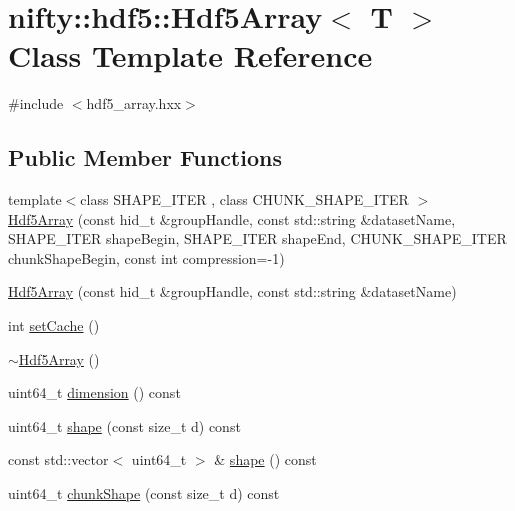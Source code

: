 \hypertarget{classnifty_1_1hdf5_1_1Hdf5Array}{}\section{nifty\+:\+:hdf5\+:\+:Hdf5\+Array$<$ T $>$ Class Template Reference}
\label{classnifty_1_1hdf5_1_1Hdf5Array}


{\ttfamily \#include $<$hdf5\+\_\+array.\+hxx$>$}

\subsection*{Public Member Functions}
\begin{DoxyCompactItemize}
\item 
{\footnotesize template$<$class S\+H\+A\+P\+E\+\_\+\+I\+T\+E\+R , class C\+H\+U\+N\+K\+\_\+\+S\+H\+A\+P\+E\+\_\+\+I\+T\+E\+R $>$ }\\\hyperlink{classnifty_1_1hdf5_1_1Hdf5Array_af164b10a52ab55e3f5a72004b6f6e278}{Hdf5\+Array} (const hid\+\_\+t \&group\+Handle, const std\+::string \&dataset\+Name, S\+H\+A\+P\+E\+\_\+\+I\+T\+E\+R shape\+Begin, S\+H\+A\+P\+E\+\_\+\+I\+T\+E\+R shape\+End, C\+H\+U\+N\+K\+\_\+\+S\+H\+A\+P\+E\+\_\+\+I\+T\+E\+R chunk\+Shape\+Begin, const int compression=-\/1)
\item 
\hyperlink{classnifty_1_1hdf5_1_1Hdf5Array_a8ce039a0d357f3c20a30fa5f6d595cb5}{Hdf5\+Array} (const hid\+\_\+t \&group\+Handle, const std\+::string \&dataset\+Name)
\item 
int \hyperlink{classnifty_1_1hdf5_1_1Hdf5Array_a59e94ddc29dd4ba7e85a11c68960ea77}{set\+Cache} ()
\item 
\hyperlink{classnifty_1_1hdf5_1_1Hdf5Array_a6f02962174e64b4c893b287f735cd30d}{$\sim$\+Hdf5\+Array} ()
\item 
uint64\+\_\+t \hyperlink{classnifty_1_1hdf5_1_1Hdf5Array_a31ff7ce3b1524babd925a2013c590665}{dimension} () const 
\item 
uint64\+\_\+t \hyperlink{classnifty_1_1hdf5_1_1Hdf5Array_aeb4aac8f0da32df48d776c608798991e}{shape} (const size\+\_\+t d) const 
\item 
const std\+::vector$<$ uint64\+\_\+t $>$ \& \hyperlink{classnifty_1_1hdf5_1_1Hdf5Array_af749bd9be409404fb41fa614dcdd3c45}{shape} () const 
\item 
uint64\+\_\+t \hyperlink{classnifty_1_1hdf5_1_1Hdf5Array_a18194b4d9b9424c9b2e132185b517687}{chunk\+Shape} (const size\+\_\+t d) const 
\item 

\end{DoxyCompactItemize}
